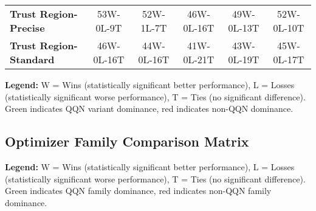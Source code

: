 \documentclass[10pt]{article}
\begin{document}
\begin{table}[H]
{\begin{tabular}{lccccc}
\textbf{Trust Region-Precise} & \textcolor{green!70!black}{53W-0L-9T} & \textcolor{green!70!black}{52W-1L-7T} & \textcolor{green!70!black}{46W-0L-16T} & \textcolor{green!70!black}{49W-0L-13T} & \textcolor{green!70!black}{52W-0L-10T} \\
\textbf{Trust Region-Standard} & \textcolor{green!70!black}{46W-0L-16T} & \textcolor{green!70!black}{44W-0L-16T} & \textcolor{green!70!black}{41W-0L-21T} & \textcolor{green!70!black}{43W-0L-19T} & \textcolor{green!70!black}{45W-0L-17T} \\
\bottomrule
\end{tabular}
}
\end{table}
\textbf{Legend:} W = Wins (statistically significant better performance), L = Losses (statistically significant worse performance), T = Ties (no significant difference). Green indicates QQN variant dominance, red indicates non-QQN dominance.

\subsection{Optimizer Family Comparison Matrix}
\begin{table}[H]
\centering
\caption{Optimizer Family Comparison Matrix}
\label{tab:family_comparison_matrix}
\end{table}
\textbf{Legend:} W = Wins (statistically significant better performance), L = Losses (statistically significant worse performance), T = Ties (no significant difference). Green indicates QQN family dominance, red indicates non-QQN family dominance.
\end{document}
